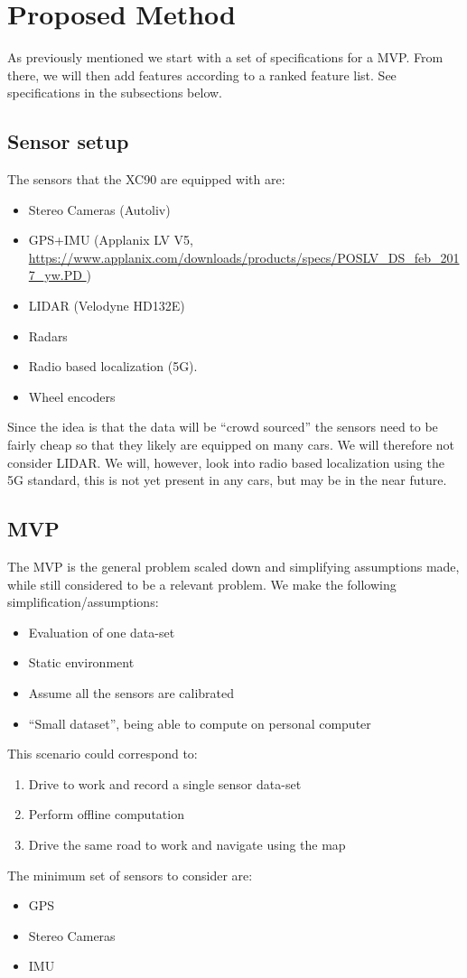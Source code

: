 \section{Proposed Method}

As previously mentioned we start with a set of specifications for a \gls{MVP}. From there, we will then add features according to a ranked feature list. See specifications in the subsections below.

\subsection{Sensor setup}\label{sec:sensor-setup}
The sensors that the XC90 are equipped with are:
\begin{itemize}
\item Stereo Cameras (Autoliv)
\item GPS+IMU (Applanix LV V5,
  \url{https://www.applanix.com/downloads/products/specs/POSLV_DS_feb_2017_yw.PD
  })
\item  \gls{LIDAR} (Velodyne HD132E)
\item  Radars
\item  Radio based localization (5G).
\item  Wheel encoders
\end{itemize}

Since the idea is that the data will be “crowd sourced” the sensors
need to be fairly cheap so that they likely are equipped on many
cars. We will therefore not consider \gls{LIDAR}. We will, however, look
into radio based localization using the 5G standard, this is not yet
present in any cars, but may be in the near future.

\subsection{\gls{MVP}}

The \gls{MVP} is the general problem scaled down and simplifying
assumptions made, while still considered to be a relevant problem. We make the following
simplification/assumptions:
\begin{itemize}
\item Evaluation of one data-set
\item Static environment
\item Assume all the sensors are calibrated
\item ``Small dataset'', being able to compute on personal computer
\end{itemize}
This scenario could correspond to:
\begin{enumerate}
\item Drive to work and record a single sensor data-set
\item Perform offline computation
\item Drive the same road to work and navigate using the map
\end{enumerate}
The minimum set of sensors to consider are:
\begin{itemize}
\item GPS
\item Stereo Cameras
\item IMU
\end{itemize}

